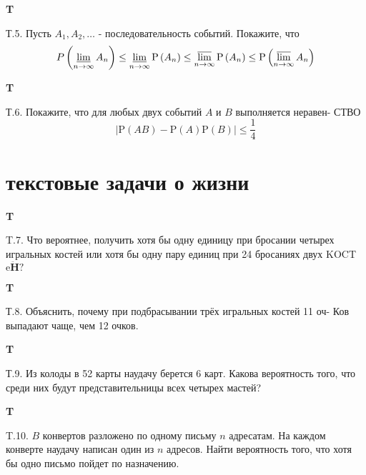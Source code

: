 \documentclass[a4paper,12pt]{article} %
\begin{document}
\begin{example}\textbf{T}




\end{example}


Т.5. Пусть $A_{1}, A_{2}, \ldots$ - последовательность событий. Покажите, что
$$
P\left(\varliminf_{n \rightarrow \infty} A_{n}\right) \leq \varliminf_{n \rightarrow \infty} \mathrm{P}\left(A_{n}\right) \leq \varlimsup_{n \rightarrow \infty} \mathrm{P}\left(A_{n}\right) \leq \mathrm{P}\left(\varlimsup_{n \rightarrow \infty} A_{n}\right)
$$


\begin{example}\textbf{T}

Т.6. Покажите, что для любых двух событий $A$ и $B$ выполняется неравен-
СТВО
$$
|\mathrm{P}(A B)-\mathrm{P}(A) \mathrm{P}(B)| \leq \frac{1}{4}
$$


\end{example}


\section{текстовые задачи о жизни}

\begin{example}\textbf{T}

T.7. Что вероятнее, получить хотя бы одну единицу при бросании четырех игральных костей или хотя бы одну пару единиц при 24 бросаниях двух
KOCT $\mathrm{e} \ddot{\mathbf{H}} ?$


\end{example}


\begin{example}\textbf{T}

Т.8. Объяснить, почему при подбрасывании трёх игральных костей 11 оч-
Ков выпадают чаще, чем 12 очков.


\end{example}




\begin{example}\textbf{T}


Т.9. Из колоды в 52 карты наудачу берется 6 карт. Какова вероятность того, что среди них будут представительницы всех четырех мастей?

\end{example}


\begin{example}\textbf{T}

T.10. $B$ конвертов разложено по одному письму $n$ адресатам. На каждом конверте наудачу написан один из $n$ адресов. Найти вероятность того,
что хотя бы одно письмо пойдет по назначению.


\end{example}
\end{document}
